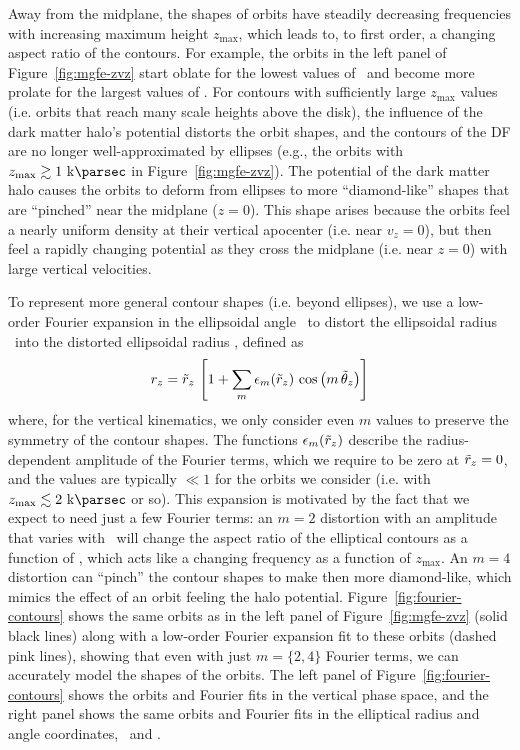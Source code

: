 Away from the midplane, the shapes of orbits have steadily decreasing frequencies with
increasing maximum height $z_{\textrm{max}}$, which leads to, to first order, a changing
aspect ratio of the contours.
For example, the orbits in the left panel of Figure~\ref{fig:mgfe-zvz} start oblate for
the lowest values of \zmax\ and become more prolate for the largest values of \zmax.
For contours with sufficiently large $z_{\textrm{max}}$ values (i.e. orbits that reach
many scale heights above the disk), the influence of the dark matter halo's potential
distorts the orbit shapes, and the contours of the DF are no longer well-approximated by
ellipses (e.g., the orbits with $\zmax \gtrsim 1~\kpc$ in Figure~\ref{fig:mgfe-zvz}).
The potential of the dark matter halo causes the orbits to deform from ellipses to more
``diamond-like'' shapes that are ``pinched'' near the midplane ($z=0$).
This shape arises because the orbits feel a nearly uniform density at their vertical
apocenter (i.e. near $v_z = 0$), but then feel a rapidly changing potential as they
cross the midplane (i.e. near $z=0$) with large vertical velocities.

To represent more general contour shapes (i.e. beyond ellipses), we use a low-order
Fourier expansion in the ellipsoidal angle \thzp\ to distort the ellipsoidal radius
\rzp\ into the distorted ellipsoidal radius \rz, defined as
\begin{equation}
    r_z = \tilde{r}_z \, \left[1 + \sum_m \epsilon_m(\tilde{r}_z) \, \cos{\left(m\,\ensuremath{\tilde{\theta}_z}\right)}\right] \label{eq:rz}
\end{equation}
where, for the vertical kinematics, we only consider even $m$ values to preserve the
symmetry of the contour shapes.
The functions $\epsilon_m(\tilde{r}_z)$ describe the radius-dependent amplitude of the Fourier
terms, which we require to be zero at $\tilde{r}_z=0$, and the values are typically $\ll 1$
for the orbits we consider (i.e. with $\zmax \lesssim 2~\kpc$ or so).
This expansion is motivated by the fact that we expect to need just a few Fourier terms:
an $m=2$ distortion with an amplitude that varies with \rzp\ will change the aspect
ratio of the elliptical contours as a function of \rzp, which acts like a changing
frequency as a function of $z_{\textrm{max}}$.
An $m=4$ distortion can ``pinch'' the contour shapes to make then more diamond-like,
which mimics the effect of an orbit feeling the halo potential.
Figure~\ref{fig:fourier-contours} shows the same orbits as in the left panel of
Figure~\ref{fig:mgfe-zvz} (solid black lines) along with a low-order Fourier expansion
fit to these orbits (dashed pink lines), showing that even with just $m=\{2, 4\}$
Fourier terms, we can accurately model the shapes of the orbits.
The left panel of Figure~\ref{fig:fourier-contours} shows the orbits and Fourier fits in
the vertical phase space, and the right panel shows the same orbits and Fourier fits in
the elliptical radius and angle coordinates, \rzp\ and \thzp.

